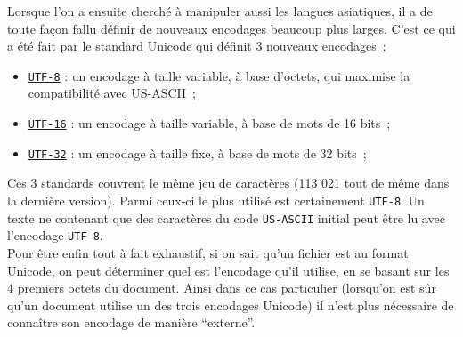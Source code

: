     Lorsque l'on a ensuite cherché à manipuler aussi les langues asiatiques,
il a de toute façon fallu définir de nouveaux encodages beaucoup plus
larges. C'est ce qui a été fait par le standard
\href{http://en.wikipedia.org/wiki/Unicode}{Unicode} qui définit 3
nouveaux encodages~:
\begin{itemize}
	\item
	\href{http://en.wikipedia.org/wiki/UTF-8}{\texttt{UTF-8}} : un encodage
	à taille variable, à base d'octets, qui maximise la compatibilité avec
	US-ASCII~;
	\item
	\href{http://en.wikipedia.org/wiki/UTF-16}{\texttt{UTF-16}}
	: un encodage à taille variable, à base de mots de 16 bits~;
	\item
	\href{http://en.wikipedia.org/wiki/UTF-32}{\texttt{UTF-32}} : un
	encodage à taille fixe, à base de mots de 32 bits~;\\
\end{itemize}
Ces 3 standards couvrent le même jeu de caractères (113 021 tout de même
dans la dernière version). Parmi ceux-ci le plus utilisé est
certainement \texttt{UTF-8}. Un texte ne contenant que des caractères du
code \texttt{US-ASCII} initial peut être lu avec l'encodage
\texttt{UTF-8}.\\

Pour être enfin tout à fait exhaustif, si on sait qu'un fichier est au
format Unicode, on peut déterminer quel est l'encodage qu'il utilise, en
se basant sur les 4 premiers octets du document. Ainsi dans ce cas
particulier (lorsqu'on est sûr qu'un document utilise un des trois
encodages Unicode) il n'est plus nécessaire de connaître son encodage de
manière ``externe''.
